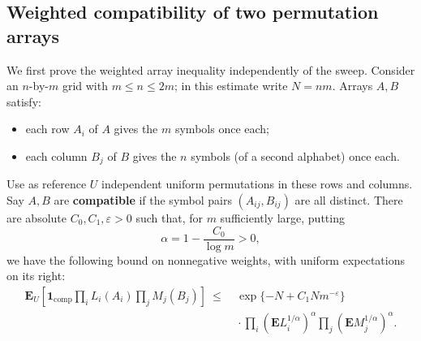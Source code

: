 \subsection{Weighted compatibility of two permutation arrays}
\label{tra:tilted-arrays:array-definition}
We first prove the weighted array inequality independently of the sweep. Consider an \(n\)-by-\(m\) grid with \(m\le n\le 2m\); in this estimate write \(N=nm\). Arrays \(A,B\) satisfy:
\begin{itemize}
\item each row \(A_i\) of \(A\) gives the \(m\) symbols once each;
\item each column \(B_j\) of \(B\) gives the \(n\) symbols (of a second alphabet) once each.
\end{itemize}
\begin{proposition}\label{tra:tilted-arrays:weighted}
\label{tra:tilted-arrays:weighted-statement}
Use as reference \(U\) independent uniform permutations in these rows and columns. Say \(A,B\) are \textbf{compatible} if the symbol pairs \((A_{ij},B_{ij})\) are all distinct. There are absolute \(C_0,C_1,\varepsilon>0\) such that, for \(m\) sufficiently large, putting
\[
\alpha=1-\frac{C_0}{\log m}>0,
\]
we have the following bound on nonnegative weights, with uniform expectations on its right:
\begin{equation}
\begin{split}
\mathbf E_U\left[\mathbf 1_{\mathrm{comp}}\prod_i L_i(A_i)\prod_j M_j(B_j)\right]
\ \le\ &\exp\{-N+C_1N m^{-\varepsilon}\}\\
&{}\cdot
\prod_i\left(\mathbf E L_i^{1/\alpha}\right)^\alpha
\prod_j\left(\mathbf E M_j^{1/\alpha}\right)^\alpha .
\end{split}\label{tra:tilted-arrays:eq2}
\end{equation}
\end{proposition}
